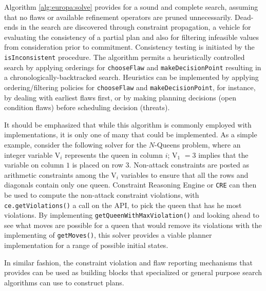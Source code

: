 Algorithm \ref{alg:europa:solve} provides for a sound and complete
search, assuming that no flaws or available refinement operators are
pruned unnecessarily.  Dead-ends in the search are discovered through
constraint propagation, a vehicle for evaluating the consistency of a
partial plan and also for filtering infeasible values from
consideration prior to commitment. %
Consistency testing is initiated by the \texttt{isInconsistent}
procedure. The algorithm permits a heuristically controlled search by
applying orderings for \texttt{chooseFlaw} and
\texttt{makeDecisionPoint} resulting in a chronologically-backtracked
search. Heuristics can be implemented by applying ordering/filtering
policies for \texttt{chooseFlaw} and \texttt{makeDecisionPoint}, for
instance, by dealing with earliest flaws first, or by making planning
decisions (open condition flaws) before scheduling decision (threats).

It should be emphasized that while this algorithm is commonly employed
with \eu implementations, it is only one of many that could be
implemented. As a simple example, consider the following solver for
the $N$-Queens problem, where an integer variable V$_i$ represents the
queen in column $i$; V$_1$ $= 3$ implies that the variable on column
$1$ is placed on row $3$.  Non-attack constraints are posted as
arithmetic constraints among the V$_i$ variables to ensure that all
the rows and diagonals contain only one queen. \eus Constraint
Reasoning Engine or \texttt{CRE} can then be used to compute the
non-attack constraint violations, with \texttt{ce.getViolations()} a
call on the API, to pick the queen that has he most violations.  By
implementing \texttt{getQueenWithMaxViolation()} and looking ahead to
see what moves are possible for a queen that would remove its
violations with the implementing of \texttt{getMoves()}, this solver
provides a viable planner implementation for a range of possible
initial states.

\begin{algorithm}[H]
  \caption{$solveNQueens(ce, maxIter)$}
\end{algorithm}

In similar fashion, the constraint violation and flaw reporting
mechanisms that \eu provides can be used as building blocks that
specialized or general purpose search algorithms can use to construct
plans.




 